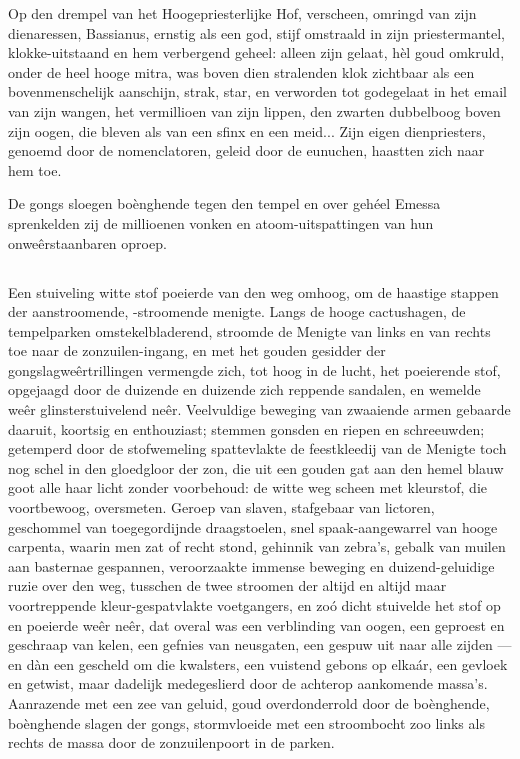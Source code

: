 \documentclass[a4paper, 12pt, oneside, dutch]{article}
\begin{document}
Op den drempel van het Hoogepriesterlijke Hof, verscheen, omringd van zijn dienaressen, Bassianus, ernstig als een god, stijf omstraald in zijn priestermantel, klokke-uitstaand en hem verbergend geheel: alleen zijn gelaat, hèl goud omkruld, onder de heel hooge mitra, was boven dien stralenden klok zichtbaar als een bovenmenschelijk aanschijn, strak, star, en verworden tot godegelaat in het email van zijn wangen, het vermillioen van zijn lippen, den zwarten dubbelboog boven zijn oogen, die bleven als van een sfinx en een meid... Zijn eigen dienpriesters, genoemd door de nomenclatoren, geleid door de eunuchen, haastten zich naar hem toe.

De gongs sloegen boènghende tegen den tempel en over gehéel Emessa sprenkelden zij de millioenen vonken en atoom-uitspattingen van hun onweêrstaanbaren oproep.

\subsection{}
\paragraph{}
Een stuiveling witte stof poeierde van den weg omhoog, om de haastige stappen der aanstroomende, -stroomende menigte. Langs de hooge cactushagen, de tempelparken omstekelbladerend, stroomde de Menigte van links en van rechts toe naar de zonzuilen-ingang, en met het gouden gesidder der gongslagweêrtrillingen vermengde zich, tot hoog in de lucht, het poeierende stof, opgejaagd door de duizende en duizende zich reppende sandalen, en wemelde weêr glinsterstuivelend neêr. Veelvuldige beweging van zwaaiende armen gebaarde daaruit, koortsig en enthouziast; stemmen gonsden en riepen en schreeuwden; getemperd door de stofwemeling spattevlakte de feestkleedij van de Menigte toch nog schel in den gloedgloor der zon, die uit een gouden gat aan den hemel blauw goot alle haar licht zonder voorbehoud: de witte weg scheen met kleurstof, die voortbewoog, oversmeten. Geroep van slaven, stafgebaar van lictoren, geschommel van toegegordijnde draagstoelen, snel spaak-aangewarrel van hooge carpenta, waarin men zat of recht stond, gehinnik van zebra's, gebalk van muilen aan basternae gespannen, veroorzaakte immense beweging en duizend-geluidige ruzie over den weg, tusschen de twee stroomen der altijd en altijd maar voortreppende kleur-gespatvlakte voetgangers, en zoó dicht stuivelde het stof op en poeierde weêr neêr, dat overal was een verblinding van oogen, een geproest en geschraap van kelen, een gefnies van neusgaten, een gespuw uit naar alle zijden --- en dàn een gescheld om die kwalsters, een vuistend gebons op elkaár, een gevloek en getwist, maar dadelijk medegeslierd door de achterop aankomende massa's. Aanrazende met een zee van geluid, goud overdonderrold door de boènghende, boènghende slagen der gongs, stormvloeide met een stroombocht zoo links als rechts de massa door de zonzuilenpoort in de parken.
\end{document}
